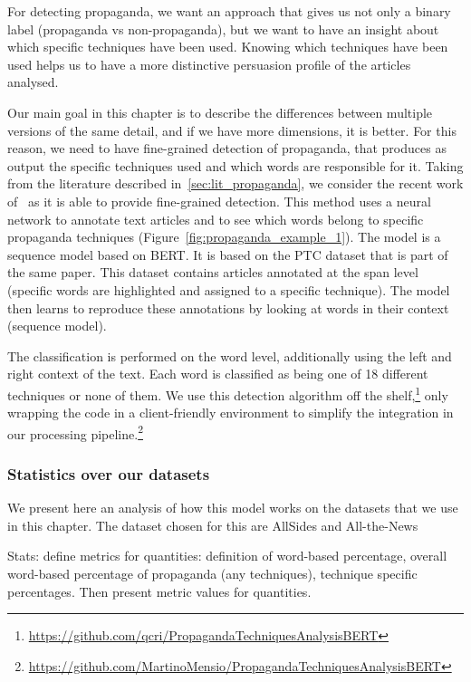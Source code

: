 For detecting propaganda, we want an approach that gives us not only a binary label (propaganda vs non-propaganda), but we want to have an insight about which specific techniques have been used.
Knowing which techniques have been used helps us to have a more distinctive persuasion profile of the articles analysed.

Our main goal in this chapter is to describe the differences between multiple versions of the same detail, and if we have more dimensions, it is better.
For this reason, we need to have fine-grained detection of propaganda, that produces as output the specific techniques used and which words are responsible for it.
Taking from the literature described in~\ref{sec:lit_propaganda}, we consider the recent work of~\cite{da2019fine} as it is able to provide fine-grained detection. This method uses a neural network to annotate text articles and to see which words belong to specific propaganda techniques (Figure~\ref{fig:propaganda_example_1}).
The model is a sequence model based on BERT. It is based on the PTC dataset that is part of the same paper. This dataset contains articles annotated at the span level (specific words are highlighted and assigned to a specific technique). The model then learns to reproduce these annotations by looking at words in their context (sequence model).

The classification is performed on the word level, additionally using the left and right context of the text. Each word is classified as being one of 18 different techniques or none of them.
We use this detection algorithm off the shelf,\footnote{\url{https://github.com/qcri/PropagandaTechniquesAnalysisBERT}} only wrapping the code in a client-friendly environment to simplify the integration in our processing pipeline.\footnote{\url{https://github.com/MartinoMensio/PropagandaTechniquesAnalysisBERT}}


\subsubsection{\statusred Statistics over our datasets}
\label{ssec:lp_techniques_propaganda_stats}

We present here an analysis of how this model works on the datasets that we use in this chapter.
The dataset chosen for this are AllSides and All-the-News

Stats: 
define metrics for quantities: definition of word-based percentage, overall word-based percentage of propaganda (any techniques), technique specific percentages.
Then present metric values for quantities.

